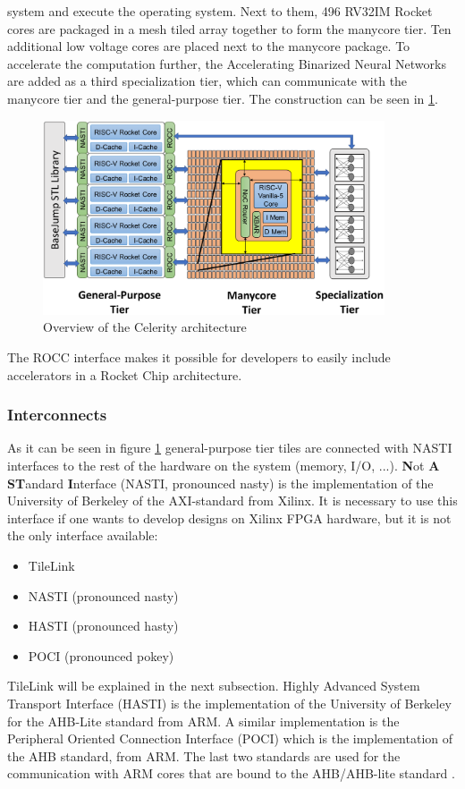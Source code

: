 system and execute the operating system.
Next to them, 496 RV32IM Rocket cores are packaged
in a mesh tiled array together to form the manycore
tier. Ten additional low voltage cores are
placed next to the manycore package.
To accelerate the computation further, the
Accelerating Binarized Neural Networks are added
as a third specialization tier, which can communicate
with the manycore tier and the general-purpose tier.
The construction can be seen in
\ref{fig:celerity_design}.
\begin{figure}
    \centering
    \includegraphics[width=0.9\textwidth]{figures/celerity_design}
    \caption{Overview of the Celerity architecture \cite{opencelerity_page}}
    \label{fig:celerity_design}
\end{figure}
The ROCC interface makes it possible for developers
to easily include accelerators in a Rocket Chip architecture.

\subsubsection{Interconnects}
As it can be seen in figure \ref{fig:celerity_design}
general-purpose tier tiles are connected with NASTI
interfaces to the rest of the hardware on the system
(memory, I/O, ...). \textbf{N}ot \textbf{A}
\textbf{ST}andard \textbf{I}nterface
(NASTI, pronounced nasty) is the
implementation of the University of Berkeley of the
AXI-standard from Xilinx. It is necessary to
use this interface if one wants to develop designs
on Xilinx FPGA hardware, but it is not the only
interface available:
\begin{itemize}
    \item TileLink
    \item NASTI (pronounced nasty) 
    \item HASTI (pronounced hasty)
    \item POCI (pronounced pokey)
\end{itemize}
TileLink will be explained in the next subsection.
Highly Advanced System Transport Interface (HASTI) is the
implementation of the University of Berkeley for the
AHB-Lite standard from ARM.
A similar implementation is the
Peripheral Oriented Connection Interface (POCI)
which is the implementation of the AHB standard,
from ARM.
The last two standards are used for the communication
with ARM cores that are bound to the AHB/AHB-lite
standard \cite{risc-v_z-scale}.

